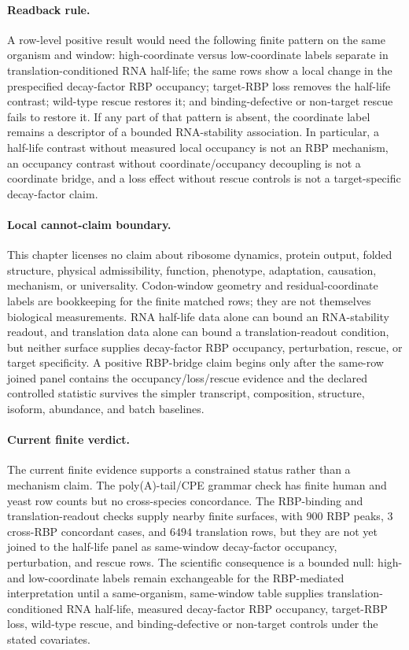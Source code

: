 \paragraph{Readback rule.}
A row-level positive result would need the following finite pattern on the same organism and window: high-coordinate versus low-coordinate labels separate in translation-conditioned RNA half-life; the same rows show a local change in the prespecified decay-factor RBP occupancy; target-RBP loss removes the half-life contrast; wild-type rescue restores it; and binding-defective or non-target rescue fails to restore it.  If any part of that pattern is absent, the coordinate label remains a descriptor of a bounded RNA-stability association.  In particular, a half-life contrast without measured local occupancy is not an RBP mechanism, an occupancy contrast without coordinate/occupancy decoupling is not a coordinate bridge, and a loss effect without rescue controls is not a target-specific decay-factor claim.

\paragraph{Local cannot-claim boundary.}
This chapter licenses no claim about ribosome dynamics, protein output, folded structure, physical admissibility, function, phenotype, adaptation, causation, mechanism, or universality.  Codon-window geometry and residual-coordinate labels are bookkeeping for the finite matched rows; they are not themselves biological measurements.  RNA half-life data alone can bound an RNA-stability readout, and translation data alone can bound a translation-readout condition, but neither surface supplies decay-factor RBP occupancy, perturbation, rescue, or target specificity.  A positive RBP-bridge claim begins only after the same-row joined panel contains the occupancy/loss/rescue evidence and the declared controlled statistic survives the simpler transcript, composition, structure, isoform, abundance, and batch baselines.

\paragraph{Current finite verdict.}
The current finite evidence supports a constrained status rather than a mechanism claim.  The poly(A)-tail/CPE grammar check has finite human and yeast row counts but no cross-species concordance.  The RBP-binding and translation-readout checks supply nearby finite surfaces, with $900$ RBP peaks, $3$ cross-RBP concordant cases, and $6494$ translation rows, but they are not yet joined to the half-life panel as same-window decay-factor occupancy, perturbation, and rescue rows.  The scientific consequence is a bounded null: high- and low-coordinate labels remain exchangeable for the RBP-mediated interpretation until a same-organism, same-window table supplies translation-conditioned RNA half-life, measured decay-factor RBP occupancy, target-RBP loss, wild-type rescue, and binding-defective or non-target controls under the stated covariates.